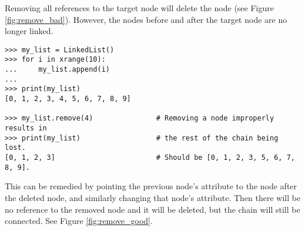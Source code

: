 Removing all references to the target node will delete the node (see Figure \ref{fig:remove_bad}).
However, the nodes before and after the target node are no longer linked.

\begin{lstlisting}
>>> my_list = LinkedList()
>>> for i in xrange(10):
...     my_list.append(i)
...
>>> print(my_list)
[0, 1, 2, 3, 4, 5, 6, 7, 8, 9]

>>> my_list.remove(4)               # Removing a node improperly results in
>>> print(my_list)                  # the rest of the chain being lost.
[0, 1, 2, 3]                        # Should be [0, 1, 2, 3, 5, 6, 7, 8, 9].
\end{lstlisting}

This can be remedied by pointing the previous node's  attribute to the node after the deleted node, and similarly changing that node's  attribute.
Then there will be no reference to the removed node and it will be deleted, but the chain will still be connected.
See Figure \ref{fig:remove_good}.

